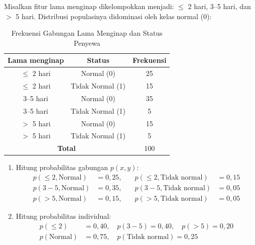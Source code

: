 \begin{enumerate}
    Misalkan fitur lama menginap dikelompokkan menjadi: $\le$ 2 hari, 3--5 hari, dan $>$ 5 hari. Distribusi populasinya didominasi oleh kelas normal (0):
    
    \begin{table}[H]
    \centering
    \caption{Frekuensi Gabungan Lama Menginap dan Status Penyewa}
    \begin{tabular}{|c|c|c|}
    \hline
    \textbf{Lama menginap} & \textbf{Status} & \textbf{Frekuensi} \\
    \hline
    $\leq$ 2 hari & Normal (0) & 25 \\
    $\leq$ 2 hari & Tidak Normal (1) & 15 \\
    3--5 hari & Normal (0) & 35 \\
    3--5 hari & Tidak Normal (1) & 5 \\
    $>$ 5 hari & Normal (0) & 15 \\
    $>$ 5 hari & Tidak Normal (1) & 5 \\
    \hline
    \multicolumn{2}{|c|}{\textbf{Total}} & 100 \\
    \hline
    \end{tabular}
    \end{table}
    
    \begin{enumerate}
        \item Hitung probabilitas gabungan $p(x, y)$:
        $$
        \begin{aligned}
        p(\leq2, \text{Normal}) &= 0{,}25, \quad &p(\leq2, \text{Tidak normal}) &= 0{,}15 \\
        p(3{-}5, \text{Normal}) &= 0{,}35, \quad &p(3{-}5, \text{Tidak normal}) &= 0{,}05 \\
        p(>5, \text{Normal}) &= 0{,}15, \quad &p(>5, \text{Tidak normal}) &= 0{,}05
        \end{aligned}
        $$
    
        \item Hitung probabilitas individual:
        $$
        \begin{aligned}
        p(\leq2) &= 0{,}40, \quad p(3{-}5) = 0{,}40, \quad p(>5) = 0{,}20 \\
        p(\text{Normal}) &= 0{,}75, \quad p(\text{Tidak normal}) = 0{,}25
        \end{aligned}
        $$
    

\end{enumerate}
\end{enumerate}
